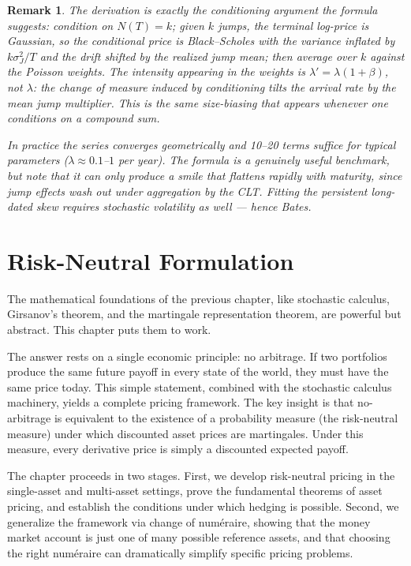 \documentclass{report}
\theoremstyle{spacedplain}
\theoremstyle{spaceddefinition}
\theoremstyle{spacedremark}
\newtheorem{remark}[theorem]{Remark}
\begin{document}
\begin{remark}
The derivation is exactly the conditioning argument the formula suggests: condition on $N(T) = k$; given $k$ jumps, the terminal log-price is Gaussian, so the conditional price is Black--Scholes with the variance inflated by $k\sigma_J^2/T$ and the drift shifted by the realized jump mean; then average over $k$ against the Poisson weights. The intensity appearing in the weights is $\lambda' = \lambda(1+\beta)$, not $\lambda$: the change of measure induced by conditioning tilts the arrival rate by the mean jump multiplier. This is the same size-biasing that appears whenever one conditions on a compound sum.

In practice the series converges geometrically and 10--20 terms suffice for typical parameters ($\lambda \approx 0.1$--$1$ per year). The formula is a genuinely useful benchmark, but note that it can only produce a \emph{smile} that flattens rapidly with maturity, since jump effects wash out under aggregation by the CLT. Fitting the persistent long-dated skew requires stochastic volatility as well --- hence Bates.
\end{remark}


\chapter{Risk-Neutral Formulation}

The mathematical foundations of the previous chapter, like stochastic calculus, Girsanov's theorem, and the martingale representation theorem, are powerful but abstract. This chapter puts them to work.

The answer rests on a single economic principle: no arbitrage. If two portfolios produce the same future payoff in every state of the world, they must have the same price today. This simple statement, combined with the stochastic calculus machinery, yields a complete pricing framework. The key insight is that no-arbitrage is equivalent to the existence of a probability measure (the risk-neutral measure) under which discounted asset prices are martingales. Under this measure, every derivative price is simply a discounted expected payoff.

The chapter proceeds in two stages. First, we develop risk-neutral pricing in the single-asset and multi-asset settings, prove the fundamental theorems of asset pricing, and establish the conditions under which hedging is possible. Second, we generalize the framework via change of num\'eraire, showing that the money market account is just one of many possible reference assets, and that choosing the right num\'eraire can dramatically simplify specific pricing problems.
\end{document}
